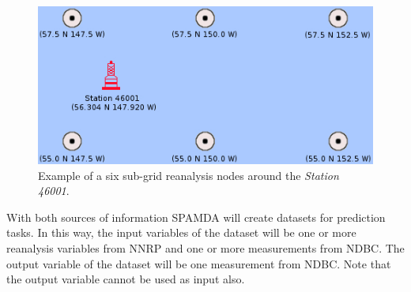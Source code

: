 \begin{onehalfspace}
\begin{itemize}
			\begin{figure}[ht!]
				\centering
				\includegraphics[scale=0.52]{figures/FigureSubGrid.jpg}
				\caption{Example of a six sub-grid reanalysis nodes around the \textit{Station 46001}.}
				\label{fig:subGrid}
			\end{figure}
			
		\end{itemize}
		
		With both sources of information SPAMDA will create datasets for prediction tasks. In this way, the input variables of the dataset will be one or more reanalysis variables from NNRP and one or more measurements from NDBC. The output variable of the dataset will be one measurement from NDBC. Note that the output variable cannot be used as input also.

	\end{onehalfspace}
